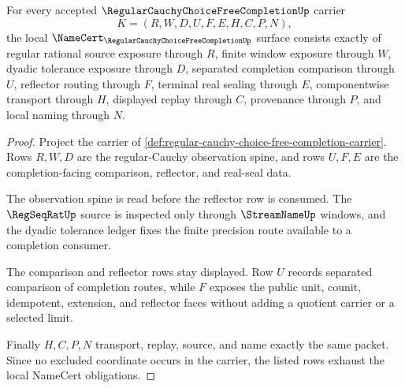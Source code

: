 \begin{theorem}
\label{thm:regular-cauchy-choice-free-completion-namecert-obligations}
For every accepted $\RegularCauchyChoiceFreeCompletionUp$ carrier
$$
K=(R,W,D,U,F,E,H,C,P,N),
$$
the local $\NameCert_{\RegularCauchyChoiceFreeCompletionUp}$ surface consists exactly of regular rational source exposure through $R$, finite window exposure through $W$, dyadic tolerance exposure through $D$, separated completion comparison through $U$, reflector routing through $F$, terminal real sealing through $E$, componentwise transport through $H$, displayed replay through $C$, provenance through $P$, and local naming through $N$.
\end{theorem}
\begin{proof}
Project the carrier of \autoref{def:regular-cauchy-choice-free-completion-carrier}. Rows $R,W,D$ are the regular-Cauchy observation spine, and rows $U,F,E$ are the completion-facing comparison, reflector, and real-seal data.

The observation spine is read before the reflector row is consumed. The $\RegSeqRatUp$ source is inspected only through $\StreamNameUp$ windows, and the dyadic tolerance ledger fixes the finite precision route available to a completion consumer.

The comparison and reflector rows stay displayed. Row $U$ records separated comparison of completion routes, while $F$ exposes the public unit, counit, idempotent, extension, and reflector faces without adding a quotient carrier or a selected limit.

Finally $H,C,P,N$ transport, replay, source, and name exactly the same packet. Since no excluded coordinate occurs in the carrier, the listed rows exhaust the local NameCert obligations.
\end{proof}

